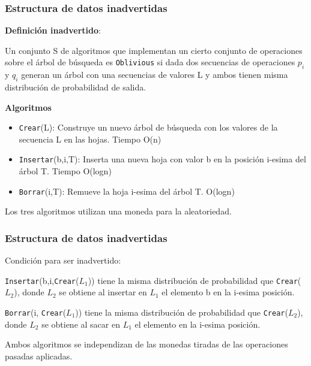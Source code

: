 \documentclass[10pt,handout]{beamer}
\begin{document}

\begin{frame}
\frametitle{Estructura de datos inadvertidas}

\textbf{Definición inadvertido}:

Un conjunto S de algoritmos que implementan un cierto conjunto de operaciones sobre el árbol de búsqueda es
\texttt{Oblivious} si dada dos secuencias de operaciones $p_i$ y $q_i$ generan un árbol con una secuencias
de valores L y ambos tienen misma distribución de probabilidad de salida.


\pause
\textbf{Algoritmos}
\begin{itemize}
  \item \texttt{Crear}(L): Construye un nuevo árbol de búsqueda con los valores de la secuencia L en las hojas. Tiempo O(n)
\pause
  \item \texttt{Insertar}(b,i,T): Inserta una nueva hoja con valor b en la posición i-esima del árbol T. Tiempo O(logn)
\pause
  \item \texttt{Borrar}(i,T): Remueve la hoja i-esima del árbol T. O(logn)
\end{itemize}

\pause
Los tres algoritmos utilizan una moneda para la aleatoriedad.


\end{frame}

\begin{frame}
\frametitle{Estructura de datos inadvertidas}

Condición para ser inadvertido:
\pause

\texttt{Insertar}(b,i,\texttt{Crear}($L_1$)) tiene la misma distribución de probabilidad que \texttt{Crear}($L_2$), donde $L_{2}$
se obtiene al insertar en $L_{1}$ el elemento b en la i-esima posición.
\pause

\texttt{Borrar}(i, \texttt{Crear}($L_{1}$)) tiene la misma distribución de probabilidad que \texttt{Crear}($L_2$), donde $L_{2}$
se obtiene al sacar en $L_{1}$ el elemento en la i-esima posición.

\pause
Ambos algoritmos se independizan de las monedas tiradas de las operaciones pasadas aplicadas.
\end{frame}
\end{document}
